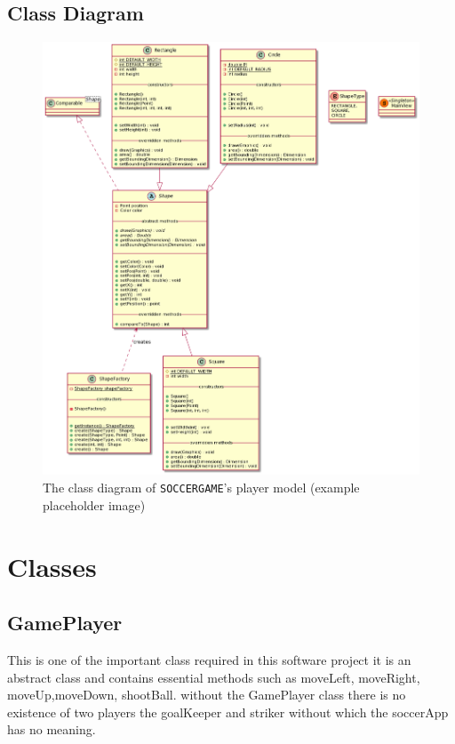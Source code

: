 \documentclass[12pt, dvipsnames, a4paper]{article}
\newcommand{\code}[1]{\texttt{#1}}
\begin{document}
\subsection{Class Diagram}
\begin{center}
	\begin{figure}[H]
		\hspace{30pt}
		\includegraphics[scale=.5]{diagrams/class-diagrams/shape-model/shape-model-alt-cd.png}
		\caption{The class diagram of \code{SOCCERGAME}'s player model (example placeholder image)}
		\label{fig:backend}
	\end{figure}
\end{center}
\clearpage

\section{Classes}
\subsection{GamePlayer}
This is one of the important class required in this software project it is an abstract class
and contains  essential methods such as moveLeft, moveRight, moveUp,moveDown, shootBall. without the GamePlayer
class there is no existence of two players the goalKeeper and striker without which the soccerApp has no meaning.
\end{document}
